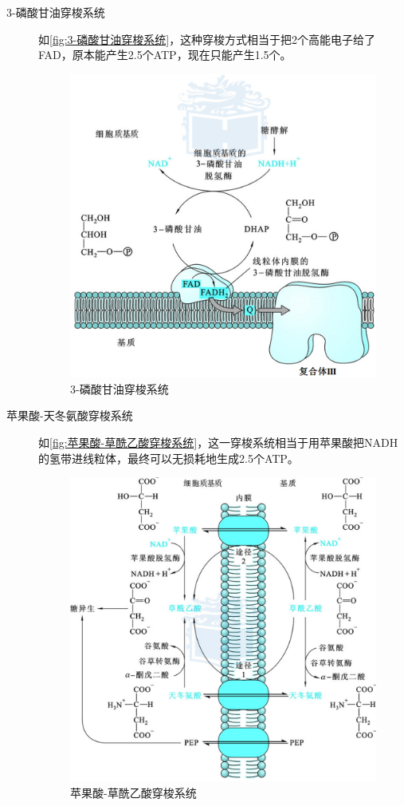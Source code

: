 \begin{description}
	\item[3-磷酸甘油穿梭系统] 如\autoref{fig:3-磷酸甘油穿梭系统}，这种穿梭方式相当于把2个高能电子给了FAD，原本能产生2.5个ATP，现在只能产生1.5个。

	\begin{figure}[htbp]
		\centering
		\includegraphics[width=0.7\linewidth]{Pics/3-磷酸甘油穿梭系统}
		\caption{3-磷酸甘油穿梭系统}
		\label{fig:3-磷酸甘油穿梭系统}
	\end{figure}

	\item[苹果酸-天冬氨酸穿梭系统] 如\autoref{fig:苹果酸-草酰乙酸穿梭系统}，这一穿梭系统相当于用苹果酸把NADH的氢带进线粒体，最终可以无损耗地生成2.5个ATP。

	\begin{figure}[htbp]
		\centering
		\includegraphics[width=0.9\linewidth]{Pics/苹果酸-草酰乙酸穿梭系统}
		\caption{苹果酸-草酰乙酸穿梭系统}
		\label{fig:苹果酸-草酰乙酸穿梭系统}
	\end{figure}

\end{description}

